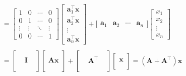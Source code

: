\documentclass[12pt,thmsa]{article}
\begin{document}
\begin{itemize}
\[\begin{aligned}
		& = \left[ \begin{array}{cccc} 
				1  & 0 & \cdots & 0 \\
				0 & 1  & \cdots & 0 \\
				\vdots  & \vdots & \ddots & \vdots   \\
				0 & 0 & \cdots & 1 
				 \end{array}\right]
			 \left[ \begin{array}{c} 
			 	\boldsymbol{a}_{1}^{\top}\boldsymbol{x} \\
			 	\boldsymbol{a}_{2}^{\top}\boldsymbol{x} \\
			 	\vdots     \\
			 	\boldsymbol{a}_{n}^{\top}\boldsymbol{x}
			 \end{array}\right] 
		  + \boldsymbol{\Big[} \begin{array}{cccc}
			  	\boldsymbol{a}_{1} & \boldsymbol{a}_{2} & \cdots & \boldsymbol{a}_{n}
			  \end{array}
			  \boldsymbol{\Big]}
			  \left[ \begin{array}{c} x_{1} \\ x_{2} \\ \vdots \\ x_{n} \end{array}\right]
		\\
		& \\
		&= \left[ \begin{array}{ccc} && \\  &\mathbf{I}& \\ &&\\ \end{array} \right]
			\left[ \begin{array}{c} \\  \mathbf{A}\boldsymbol{x} \\ \\ \end{array} \right]
		  + \left[ \begin{array}{ccc} && \\  &\mathbf{A}^{\top}& \\ &&\\ \end{array} \right]
		  	\left[ \begin{array}{c} \\ \boldsymbol{x} \\ \\ \end{array} \right] 
		  	= \left( \mathbf{A} + \mathbf{A}^{\top} \right) \boldsymbol{x}
		\\

\end{aligned}\]
\end{itemize}
\end{document}
